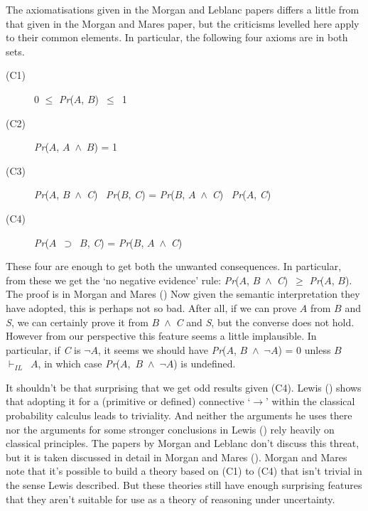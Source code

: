 \documentclass[
  11pt,
  letterpaper,
  DIV=11,
  numbers=noendperiod,
  oneside]{scrartcl}
\begin{document}
The axiomatisations given in the Morgan and Leblanc papers differs a
little from that given in the Morgan and Mares paper, but the criticisms
levelled here apply to their common elements. In particular, the
following four axioms are in both sets.

\begin{description}
\item[(C1)]
0 \({\leq}\) \emph{Pr}(\(A\), \(B\))~\({\leq}\)~1
\item[(C2)]
\emph{Pr}(\(A\), \(A\)~\({\wedge}\)~\(B\)) = 1
\item[(C3)]
\emph{Pr}(\(A\), \(B\)~\({\wedge}\)~\emph{C})~ \emph{Pr}(\(B\),
\emph{C}) = \emph{Pr}(\(B\), \(A\)~\({\wedge}\)~\emph{C})~
\emph{Pr}(\(A\), \emph{C})
\item[(C4)]
\emph{Pr}(\(A\)~\({\supset}\)~\(B\), \emph{C}) = \emph{Pr}(\(B\),
\(A\)~\({\wedge}\)~\emph{C})
\end{description}

These four are enough to get both the unwanted consequences. In
particular, from these we get the `no negative evidence' rule:
\emph{Pr}(\(A\), \(B\)~\({\wedge}\)~\emph{C})~\({\geq}\)
\emph{Pr}(\(A\), \(B\)). The proof is in Morgan and Mares
() Now given the semantic
interpretation they have adopted, this is perhaps not so bad. After all,
if we can prove \(A\) from \(B\) and \emph{S}, we can certainly prove it
from \(B\)~\({\wedge}\)~\emph{C} and \emph{S}, but the converse does not
hold. However from our perspective this feature seems a little
implausible. In particular, if \emph{C} is \({\lnot}\)\(A\), it seems we
should have \emph{Pr}(\(A\), \(B\)~\({\wedge}\)~\({\lnot}\)\(A\)) = 0
unless \(B\)~\(\vdash_{IL}\)~\(A\), in which case
\emph{Pr}(\(A\),~\(B\)~\({\wedge}\)~\({\lnot}\)\(A\)) is undefined.

It shouldn't be that surprising that we get odd results given (C4).
Lewis () shows that adopting it for a
(primitive or defined) connective `\({\rightarrow}\)' within the
classical probability calculus leads to triviality. And neither the
arguments he uses there nor the arguments for some stronger conclusions
in Lewis () rely heavily on classical
principles. The papers by Morgan and Leblanc don't discuss this threat,
but it is taken discussed in detail in Morgan and Mares
(). Morgan and Mares note that it's
possible to build a theory based on (C1) to (C4) that isn't trivial in
the sense Lewis described. But these theories still have enough
surprising features that they aren't suitable for use as a theory of
reasoning under uncertainty.
\end{document}
